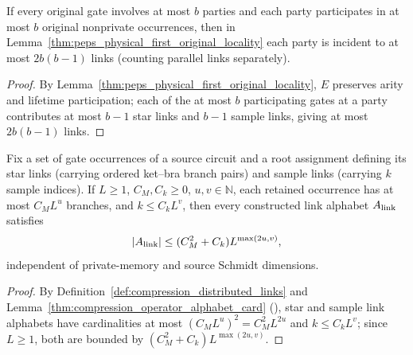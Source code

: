 \begin{lemma}
    \label{thm:peps_physical_first_original_degree}
    \leanok
    If every original gate involves at most $b$ parties and each party
    participates in at most $b$ original nonprivate occurrences, then in
    Lemma~\ref{thm:peps_physical_first_original_locality} each party is
    incident to at most $2b(b-1)$ links (counting parallel links
    separately).
\end{lemma}
\begin{proof}
    \leanok
    By Lemma~\ref{thm:peps_physical_first_original_locality}, $E$
    preserves arity and lifetime participation; each of the at most $b$
    participating gates at a party contributes at most $b-1$ star links and
    $b-1$ sample links, giving at most $2b(b-1)$ links.
\end{proof}

\begin{lemma}
    \label{thm:peps_source_alphabet_polynomial}
    \leanok
    Fix a set of gate occurrences of a source circuit and a root assignment
    defining its star links (carrying ordered ket--bra branch pairs) and
    sample links (carrying $k$ sample indices). If $L\geq1$,
    $C_M,C_k\geq0$, $u,v\in\mathbb N$, each retained occurrence has at most
    $C_ML^u$ branches, and $k\leq C_kL^v$, then every constructed link
    alphabet $A_{\rm link}$ satisfies
    \begin{align}
        |A_{\rm link}|
        \leq (C_M^2+C_k)L^{\max(2u,v)},
        \label{eq:peps_source_alphabet_polynomial}
    \end{align}
    independent of private-memory and source Schmidt dimensions.
\end{lemma}
\begin{proof}
    \leanok
    By Definition~\ref{def:compression_distributed_links} and
    Lemma~\ref{thm:compression_operator_alphabet_card}
    (\cite[Proof of Theorem~5.2]{OpenAI2026PolynomialPEPS}), star and
    sample link alphabets have cardinalities at most $(C_ML^u)^2=C_M^2L^{2u}$
    and $k\leq C_kL^v$; since $L\geq1$, both are bounded by
    $(C_M^2+C_k)L^{\max(2u,v)}$.
\end{proof}
